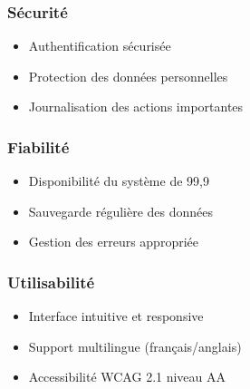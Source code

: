 \subsubsection{Sécurité}
\begin{itemize}
    \item Authentification sécurisée
    \item Protection des données personnelles
    \item Journalisation des actions importantes
\end{itemize}

\subsubsection{Fiabilité}
\begin{itemize}
    \item Disponibilité du système de 99,9%
    \item Sauvegarde régulière des données
    \item Gestion des erreurs appropriée
\end{itemize}

\subsubsection{Utilisabilité}
\begin{itemize}
    \item Interface intuitive et responsive
    \item Support multilingue (français/anglais)
    \item Accessibilité WCAG 2.1 niveau AA
\end{itemize}

